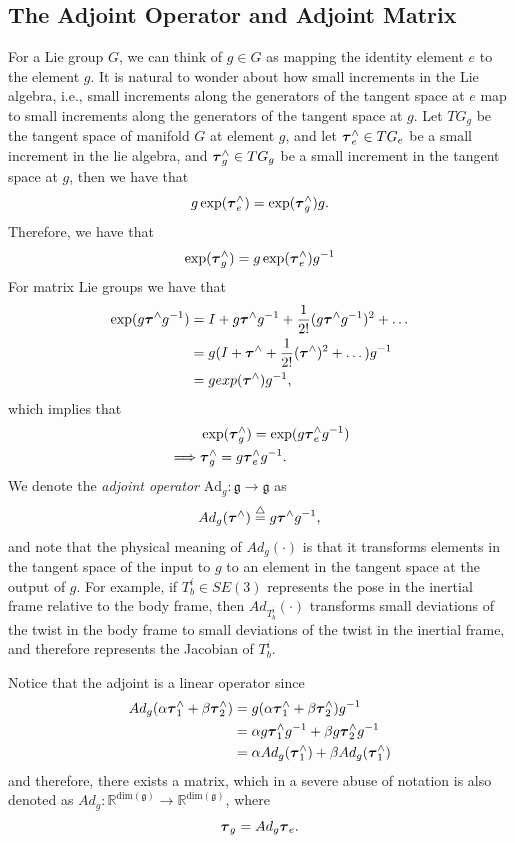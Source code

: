 \subsection{The Adjoint Operator and Adjoint Matrix}
For a Lie group $G$, we can think of $g\in G$ as mapping the identity element $e$ to the element $g$.  It is natural to wonder about how small increments in the Lie algebra, i.e., small increments along the generators of the tangent space at $e$ map to small increments along the generators of the tangent space at $g$. Let $TG_g$ be the tangent space of manifold $G$ at element $g$, and let $\boldsymbol{\tau}_e^\wedge\in TG_e$ be a small increment in the lie algebra, and $\boldsymbol{\tau}_g^\wedge\in TG_g$ be a small increment in the tangent space at $g$, then we have that
\[
g \exp(\boldsymbol{\tau}_e^\wedge) = \exp(\boldsymbol{\tau}_g^\wedge)g.
\]
Therefore, we have that
\[
\exp(\boldsymbol{\tau}_g^\wedge) = g \exp(\boldsymbol{\tau}_e^\wedge) g^{-1}
\]
For matrix Lie groups we have that
\begin{align*}
\exp(g \boldsymbol{\tau}^\wedge g^{-1}) 
	&= I + 	g \boldsymbol{\tau}^\wedge g^{-1} + \frac{1}{2!} (g \boldsymbol{\tau}^\wedge g^{-1})^2 + \dots \\
	&= g(I + 	\boldsymbol{\tau}^\wedge  + \frac{1}{2!} (\boldsymbol{\tau}^\wedge )^2 + \dots ) g^{-1} \\
	&= g exp(\boldsymbol{\tau}^\wedge) g^{-1},
\end{align*}
which implies that
\begin{align*}
& \exp(\boldsymbol{\tau}_g^\wedge) = \exp(g \boldsymbol{\tau}_e^\wedge g^{-1}) \\
\implies & \boldsymbol{\tau}_g^\wedge = g \boldsymbol{\tau}_e^\wedge g^{-1}.
\end{align*}
We denote the {\em adjoint operator} $\text{Ad}_g:\mathfrak{g}\to \mathfrak{g}$ as
\[
Ad_g(\boldsymbol{\tau}^\wedge) \stackrel{\triangle}{=} g \boldsymbol{\tau}^\wedge g^{-1},
\] 
and note that the physical meaning of $Ad_g(\cdot)$ is that it transforms elements in the tangent space of the input to $g$ to an element in the tangent space at the output of $g$.  For example, if $T_b^i\in SE(3)$ represents the pose in the inertial frame relative to the body frame, then $Ad_{T_b^i}(\cdot)$ transforms small deviations of the twist in the body frame to small deviations of the twist in the inertial frame, and therefore represents the Jacobian of $T_b^i$.

Notice that the adjoint is a linear operator since
\begin{align*}
Ad_g(\alpha \boldsymbol{\tau}_1^\wedge + \beta\boldsymbol{\tau}_2^\wedge) 
	&= g (\alpha \boldsymbol{\tau}_1^\wedge + \beta\boldsymbol{\tau}_2^\wedge)g^{-1} \\
	&= \alpha g\boldsymbol{\tau}_1^\wedge g^{-1} + \beta g\boldsymbol{\tau}_2^\wedge g^{-1} \\
	&= \alpha Ad_g(\boldsymbol{\tau}_1^\wedge) + \beta Ad_g(\boldsymbol{\tau}_1^\wedge)
\end{align*}
and therefore, there exists a matrix, which in a severe abuse of notation is also denoted as $Ad_g:\mathbb{R}^{\text{dim}(\mathfrak{g})} \to \mathbb{R}^{\text{dim}(\mathfrak{g})}$, where
\[
\boldsymbol{\tau}_g = Ad_g \boldsymbol{\tau}_e. 
\]

